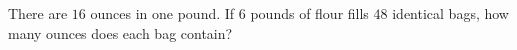 There are $16$ ounces in one pound. If $6$ pounds of flour fills $48$ identical bags, how many ounces does each bag contain?
